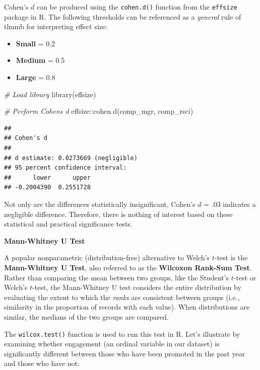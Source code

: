 \documentclass[
]{book}
\newenvironment{Shaded}{\begin{snugshade}}{\end{snugshade}}
\newcommand{\CommentTok}[1]{\textcolor[rgb]{0.56,0.35,0.01}{\textit{#1}}}
\newcommand{\FunctionTok}[1]{\textcolor[rgb]{0.00,0.00,0.00}{#1}}
\newcommand{\NormalTok}[1]{#1}
\newcommand{\SpecialCharTok}[1]{\textcolor[rgb]{0.00,0.00,0.00}{#1}}
\providecommand{\tightlist}{%
  \setlength{\itemsep}{0pt}\setlength{\parskip}{0pt}}
\begin{document}
Cohen's \(d\) can be produced using the \texttt{cohen.d()} function from the \texttt{effsize} package in R. The following thresholds can be referenced as a \emph{general} rule of thumb for interpreting effect size:

\begin{itemize}
\tightlist
\item
  \textbf{Small} = 0.2
\item
  \textbf{Medium} = 0.5
\item
  \textbf{Large} = 0.8
\end{itemize}

\begin{Shaded}
\begin{Highlighting}[]
\CommentTok{\# Load library}
\FunctionTok{library}\NormalTok{(effsize)}

\CommentTok{\# Perform Cohen\textquotesingle{}s d}
\NormalTok{effsize}\SpecialCharTok{::}\FunctionTok{cohen.d}\NormalTok{(comp\_mgr, comp\_rsci)}
\end{Highlighting}
\end{Shaded}

\begin{verbatim}
## 
## Cohen's d
## 
## d estimate: 0.0273669 (negligible)
## 95 percent confidence interval:
##      lower      upper 
## -0.2004390  0.2551728
\end{verbatim}

Not only are the differences statistically insignificant, Cohen's \(d\) = .03 indicates a negligible difference. Therefore, there is nothing of interest based on these statistical and practical significance tests.

\textbf{Mann-Whitney U Test}

A popular nonparametric (distribution-free) alternative to Welch's \(t\)-test is the \textbf{Mann-Whitney U Test}, also referred to as the \textbf{Wilcoxon Rank-Sum Test}. Rather than comparing the mean between two groups, like the Student's \(t\)-test or Welch's \(t\)-test, the Mann-Whitney U test considers the entire distribution by evaluating the extent to which the \emph{ranks} are consistent between groups (i.e., similarity in the proportion of records with each value). When distributions are similar, the medians of the two groups are compared.

The \texttt{wilcox.test()} function is used to run this test in R. Let's illustrate by examining whether engagement (an ordinal variable in our dataset) is significantly different between those who have been promoted in the past year and those who have not:
\end{document}
